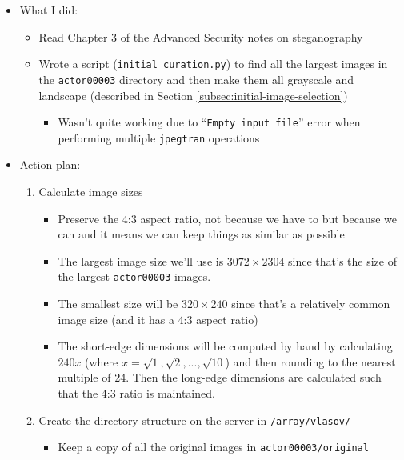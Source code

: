 \documentclass[11pt,a4paper]{report}
\begin{document}
\begin{itemize}

\item What I did:
  \begin{itemize}
  \item Read Chapter 3 of the Advanced Security notes on steganography
  \item Wrote a script (\texttt{initial\_curation.py}) to find all the largest images in the \texttt{actor00003} directory and then make them all grayscale and landscape (described in Section \ref{subsec:initial-image-selection})
    \begin{itemize}
    \item Wasn't quite working due to ``\texttt{Empty input file}'' error when performing multiple \texttt{jpegtran} operations
    \end{itemize}
  \end{itemize}

\item Action plan:
  \begin{enumerate}

  \item Calculate image sizes
    \begin{itemize}
    \item Preserve the 4:3 aspect ratio, not because we have to but because we can and it means we can keep things as similar as possible

    \item The largest image size we'll use is $3072\times2304$ since that's the size of the largest \texttt{actor00003} images.

    \item The smallest size will be $320\times240$ since that's a relatively common image size (and it has a 4:3 aspect ratio)

    \item The short-edge dimensions will be computed by hand by calculating $240x$ (where $x=\sqrt{1}, \sqrt{2},...,\sqrt{10}$) and then rounding to the nearest multiple of 24. Then the long-edge dimensions are calculated such that the 4:3 ratio is maintained.
    \end{itemize}

  \item Create the directory structure on the server in \texttt{/array/vlasov/}
    \begin{itemize}
    \item Keep a copy of all the original images in \texttt{actor00003/original}


\end{itemize}
\end{enumerate}
\end{itemize}
\end{document}
